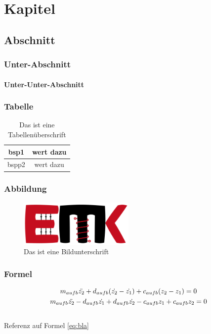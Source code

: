 \chapter{Kapitel}
\section{Abschnitt}
\subsection{Unter-Abschnitt}
\subsubsection{Unter-Unter-Abschnitt}
\subsection{Tabelle} %
    \begin{table}[htbp]
        \centering
        \caption{Das ist eine Tabellenüberschrift}
        
        \begin{tabular}{|c|c|}
        \hline bsp1     &  wert dazu\\
        \hline    bspp2      & wert dazu \\
        \hline    \end{tabular}
       
        \label{tab:damitreferenzierstdu}
    \end{table}
    
\subsection{Abbildung}

    \begin{figure}[H]
        \centering
        \includegraphics[width=0.5\textwidth]{Bilder/institutslogo.png}
        \caption{Das ist eine Bildunterschrift}
        \label{fig:damitreferenzierst du}
    \end{figure}
    
\subsection{Formel} %
    \begin{equation}
        \begin{gathered} 
            m_{aufb}\Ddot{z_2}+d_{aufb}(\Dot{z_2}-\Dot{z_1})+c_{aufb}(z_2-z_1)=0 \\
            m_{aufb}\Ddot{z_2}-d_{aufb}\Dot{z_1}+d_{aufb}\Dot{z_2}-c_{aufb}z_1+c_{aufb}z_2=0 
        \end{gathered}
        \label{eq:bla}
    \end{equation} \\
    Referenz auf Formel \ref{eq:bla}